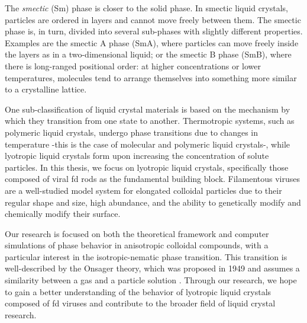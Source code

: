 The {\em smectic} (Sm) phase is closer to the solid phase. In smectic liquid crystals, particles are ordered in layers and cannot move freely between them. The smectic phase is, in turn, divided into several sub-phases with slightly different properties. Examples are the smectic A phase (SmA), where particles can move freely inside the layers as in a two-dimensional liquid; or the smectic B phase (SmB), where there is long-ranged positional order: at higher concentrations or lower temperatures, molecules tend to arrange themselves into something more similar to a crystalline lattice.

One sub-classification of liquid crystal materials is based on the mechanism by which they transition from one state to another. Thermotropic systems, such as polymeric liquid crystals, undergo phase transitions due to changes in temperature -this is the case of molecular and polymeric liquid crystals-, while lyotropic liquid crystals form upon increasing the concentration of solute particles. In this thesis, we focus on lyotropic liquid crystals, specifically those composed of viral fd rods as the fundamental building block. Filamentous viruses are a well-studied model system for elongated colloidal particles due to their regular shape and size, high abundance, and the ability to genetically modify and chemically modify their surface.

Our research is focused on both the theoretical framework and computer simulations of phase behavior in anisotropic colloidal compounds, with a particular interest in the isotropic-nematic phase transition. This transition is well-described by the Onsager theory, which was proposed in 1949 and assumes a similarity between a gas and a particle solution \cite{onsager1949}. Through our research, we hope to gain a better understanding of the behavior of lyotropic liquid crystals composed of fd viruses and contribute to the broader field of liquid crystal research.

